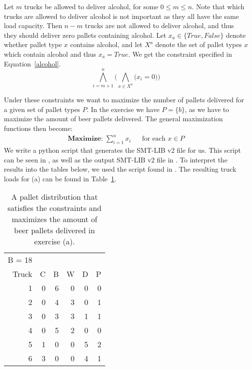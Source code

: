 Let $m$ trucks be allowed to deliver alcohol, for some $0 \leq m \leq n$. Note that which trucks are allowed to deliver alcohol is not important as they all have the same load capacity. Then $n - m$ trucks are not allowed to deliver alcohol, and thus they should deliver zero pallets containing alcohol. Let $x_a \in \{\textit{True}, \textit{False}\}$ denote whether pallet type $x$ contains alcohol, and let $X^{a}$ denote the set of pallet types $x$ which contain alcohol and thus $x_a = \textit{True}$. We get the constraint specified in Equation~\ref{alcohol}.
\begin{equation}
    \label{alcohol}
    \bigwedge^n_{i=m+1} \bigg(\bigwedge_{x \in X^a} \big( x_i = 0 \big)\bigg)
\end{equation}

Under these constraints we want to maximize the number of pallets delivered for a given set of pallet types $P$. In the exercise we have $P = \{b\}$, as we have to maximize the amount of beer pallets delivered. The general maximization functions then become:
\begin{equation}
    \begin{aligned}
    \textbf{Maximize: } \sum^n_{i=1} x_i && \text{for each }x \in P
    \end{aligned}
\end{equation}
We write a python script that generates the SMT-LIB v2 file for us. This script can be seen in , as well as the output SMT-LIB v2 file in . To interpret the results into the tables below, we used the script found in .
The resulting truck loads for (a) can be found in Table~\ref{tab:a_table}.

\begin{table}[!ht]
  \begin{tabular}{r | r r r r r}
    B = 18\\
    Truck &  C &  B &  W &  D &  P\\\hline
        1 &  0 &  6 &  0 &  0 &  0\\
        2 &  0 &  4 &  3 &  0 &  1\\
        3 &  0 &  3 &  3 &  1 &  1\\
        4 &  0 &  5 &  2 &  0 &  0\\
        5 &  1 &  0 &  0 &  5 &  2\\
        6 &  3 &  0 &  0 &  4 &  1\\
  \end{tabular}
  \caption{A pallet distribution that satisfies the constraints and maximizes the amount of beer pallets delivered in exercise (a).}
  \label{tab:a_table}
\end{table}

